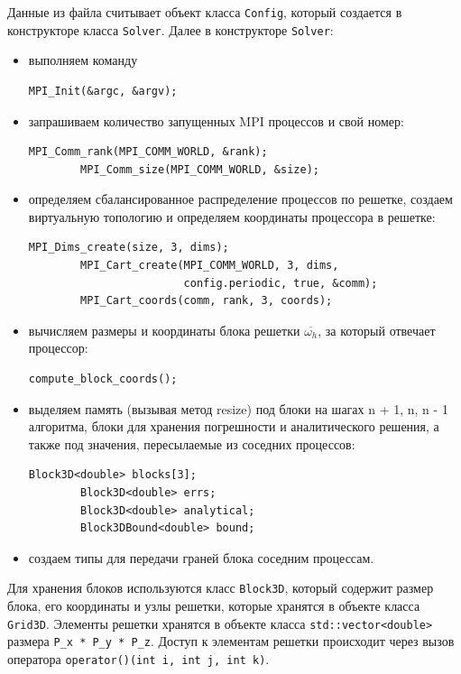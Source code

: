 \documentclass[oneside, final, 12pt]{extarticle}
\newcommand{\classname}[1]{\texttt{#1}}
\begin{document}
Данные из файла считывает объект класса \classname{Config}, который создается в конструкторе класса \classname{Solver}.
Далее в конструкторе \classname{Solver}:
\begin{itemize}
    \item выполняем команду
    \begin{lstlisting}[style=CStyle]
        MPI_Init(&argc, &argv);
    \end{lstlisting}
    \item запрашиваем количество запущенных MPI процессов и свой номер:
    \begin{lstlisting}[style=CStyle]
        MPI_Comm_rank(MPI_COMM_WORLD, &rank);
        MPI_Comm_size(MPI_COMM_WORLD, &size);
    \end{lstlisting}
    \item определяем сбалансированное распределение процессов по решетке, создаем виртуальную топологию и определяем координаты процессора в решетке:
    \begin{lstlisting}[style=CStyle]
        MPI_Dims_create(size, 3, dims);
        MPI_Cart_create(MPI_COMM_WORLD, 3, dims, 
                        config.periodic, true, &comm);
        MPI_Cart_coords(comm, rank, 3, coords);
    \end{lstlisting}    
    \item вычисляем размеры и координаты блока решетки $ \overline{\omega_h} $, за который отвечает процессор:
    \begin{lstlisting}[style=CStyle]
        compute_block_coords();
    \end{lstlisting}
    \item выделяем память (вызывая метод resize) под блоки на шагах n + 1, n, n - 1 алгоритма, блоки для хранения погрешности и аналитического решения, а также под значения,
    пересылаемые из соседних процессов:
    \begin{lstlisting}[style=CStyle]
        Block3D<double> blocks[3];
        Block3D<double> errs;
        Block3D<double> analytical;
        Block3DBound<double> bound;    
    \end{lstlisting}
    \item создаем типы для передачи граней блока соседним процессам.
\end{itemize}

Для хранения блоков используются класс \classname{Block3D}, который содержит размер блока, его координаты
 и узлы решетки, которые хранятся в объекте класса \classname{Grid3D}. Элементы решетки хранятся 
 в объекте класса \classname{std::vector<double>} размера \classname{P\_x * P\_y * P\_z}.
 Доступ к элементам решетки происходит через вызов оператора \classname{operator()(int i, int j, int k)}.
\end{document}
